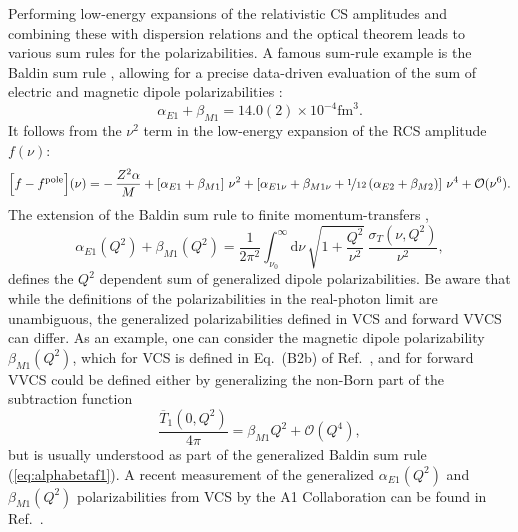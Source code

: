 \documentclass[preprints,review,accept,moreauthors,pdftex]{Definitions/mdpi}
\def\beq{\begin{equation}}
\def\eeq{\end{equation}}
\def\eqlab#1{\label{eq:#1}}
\def\eref#1{(\ref{eq:#1})}
\def\al{\alpha}
\def\be{\beta}
\def\dd{\mathrm{d}}
\def\ol#1{\overline{#1}}
\begin{document}
Performing low-energy expansions of the relativistic CS amplitudes \cite{Drechsel:1998zm,Drechsel:2002ar,Pascalutsa:2014zna}
and combining these with dispersion relations and the optical theorem leads to various sum rules for the polarizabilities. A famous sum-rule example is the Baldin sum rule \cite{Baldin:1960}, allowing for a precise data-driven evaluation of the sum of electric and magnetic dipole polarizabilities \cite{Gryniuk:2015eza}:
\beq
\al_{E1}+\be_{M1} = 14.0(2)\times 10^{-4}\text{fm}^3.
\eeq
It follows from the $\nu^2$ term in the low-energy expansion of the RCS amplitude $f(\nu)$:
\beq
\Big[f-f^\mathrm{pole}\Big](\nu)=-
\, \frac{ Z^2 \al}{M}+ \left[\alpha_{E1}+\beta_{M1}\right]\,\nu^2+\left[\alpha_{E1\nu} + \beta_{M1\nu} + \nicefrac{1}{12}\,(\alpha_{E2} + \beta_{M2}) \right]\,\nu^4
+\mathcal{O}(\nu^6)\eqlab{T1LEX}.
\eeq
The extension of the Baldin sum rule to finite momentum-transfers \cite{Drechsel:2002ar},
\beq
\al_{E1}(Q^2)+\beta_{M1}(Q^2)=\frac{1}{2 \pi^2} \int_{\nu_0}^\infty \! \dd\nu\,\sqrt{1+\frac{Q^2}{\nu^2}}\, \frac{\sigma_T (\nu,Q^2)}{\nu^2},\eqlab{alphabetaf1}
\eeq
defines the $Q^2$ dependent sum of generalized dipole polarizabilities. Be aware that while the definitions of the polarizabilities in the real-photon limit are unambiguous, the generalized polarizabilities defined in VCS and forward VVCS can differ. As an example, one can consider the magnetic dipole polarizability $\beta_{M1}(Q^2)$, which for VCS is defined in Eq.~(B2b) of Ref.~\cite{Lensky:2017bwi}, and for forward VVCS could be defined either by generalizing the non-Born part of the subtraction function 
\beq
\eqlab{subtractionfunction}
\frac{ \ol T_1(0,Q
^2)}{4\pi}= \beta_{M1}Q^2+\mathcal{O}(Q^4), 
\eeq
but is usually understood as part of the generalized Baldin sum rule \eref{alphabetaf1}. 
A recent measurement of the generalized $\al_{E1}(Q^2)$ and $\beta_{M1}(Q^2)$ polarizabilities from VCS by the A1 Collaboration can be found in Ref.~\cite{Bericic:2019faq}.
\end{document}
